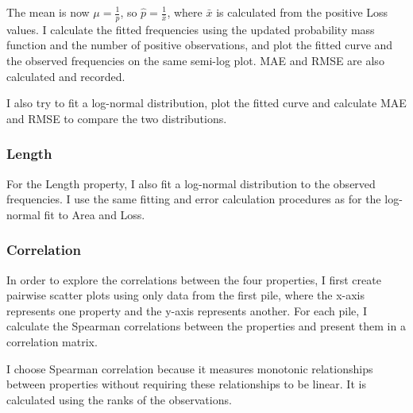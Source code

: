 The mean is now $\mu = \frac{1}{p}$, so $\hat p = \frac{1}{\bar{x}}$, where $\bar{x}$ is calculated from the positive Loss values. I calculate the fitted frequencies using the updated probability mass function and the number of positive observations, and plot the fitted curve and the observed frequencies on the same semi-log plot. MAE and RMSE are also calculated and recorded. 

I also try to fit a log-normal distribution, plot the fitted curve and calculate MAE and RMSE to compare the two distributions.

\subsubsection{Length}

For the Length property, I also fit a log-normal distribution to the observed frequencies. I use the same fitting and error calculation procedures as for the log-normal fit to Area and Loss.

\subsubsection{Correlation}
In order to explore the correlations between the four properties, I first create pairwise scatter plots using only data from the first pile, where the x-axis represents one property and the y-axis represents another. For each pile, I calculate the Spearman correlations between the properties and present them in a correlation matrix. 

I choose Spearman correlation because it measures monotonic relationships between properties without requiring these relationships to be linear. It is calculated using the ranks of the observations.

